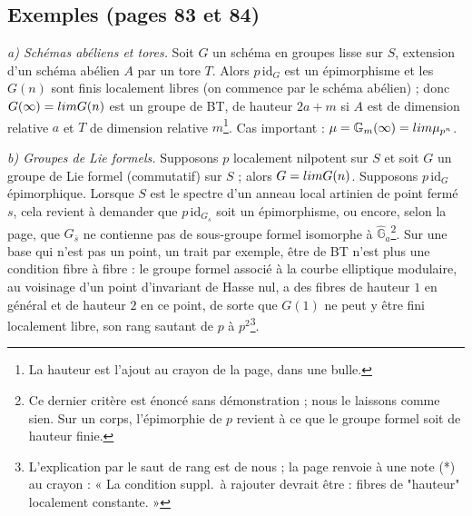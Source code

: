 \documentclass[11pt,a4paper]{article}
\begin{document}
\subsection*{Exemples (pages 83 et 84)}

\emph{a) Schémas abéliens et tores.} Soit $G$ un schéma en groupes lisse
sur $S$, extension d'un schéma abélien $A$ par un tore $T$. Alors
$p\,\mathrm{id}_G$ est un épimorphisme et les $G(n)$ sont finis
localement libres (on commence par le schéma abélien) ; donc
$G(\infty) = \varinjlim G(n)$ est un groupe de BT, de hauteur $2a + m$
si $A$ est de dimension relative $a$ et $T$ de dimension relative
$m$\footnote{La hauteur est l'ajout au crayon de la page, dans une bulle.}.
Cas important : $\mu = \mathbb{G}_m(\infty) = \varinjlim \mu_{p^{n}}$.

\emph{b) Groupes de Lie formels.} Supposons $p$ localement nilpotent sur
$S$ et soit $G$ un groupe de Lie formel (commutatif) sur $S$ ; alors
$G = \varinjlim G(n)$. Supposons $p\,\mathrm{id}_G$ épimorphique.
Lorsque $S$ est le spectre d'un anneau local artinien de point fermé $s$,
cela revient à demander que $p\,\mathrm{id}_{G_s}$ soit un épimorphisme,
ou encore, selon la page, que $G_{\bar s}$ ne contienne pas de sous-groupe
formel isomorphe à $\widehat{\mathbb{G}}_a$\footnote{Ce dernier critère
est énoncé sans démonstration ; nous le laissons comme sien. Sur un corps,
l'épimorphie de $p$ revient à ce que le groupe formel soit de hauteur
finie.}. Sur une base qui n'est pas un point, un trait par exemple, être
de BT n'est plus une condition fibre à fibre : le groupe formel associé à
la courbe elliptique modulaire, au voisinage d'un point d'invariant de
Hasse nul, a des fibres de hauteur $1$ en général et de hauteur $2$ en ce
point, de sorte que $G(1)$ ne peut y être fini localement libre, son rang
sautant de $p$ à $p^{2}$\footnote{L'explication par le saut de rang est de
nous ; la page renvoie à une note (*) au crayon : « La condition suppl.\ à
rajouter devrait être : fibres de "hauteur" localement constante. »}.
\end{document}
